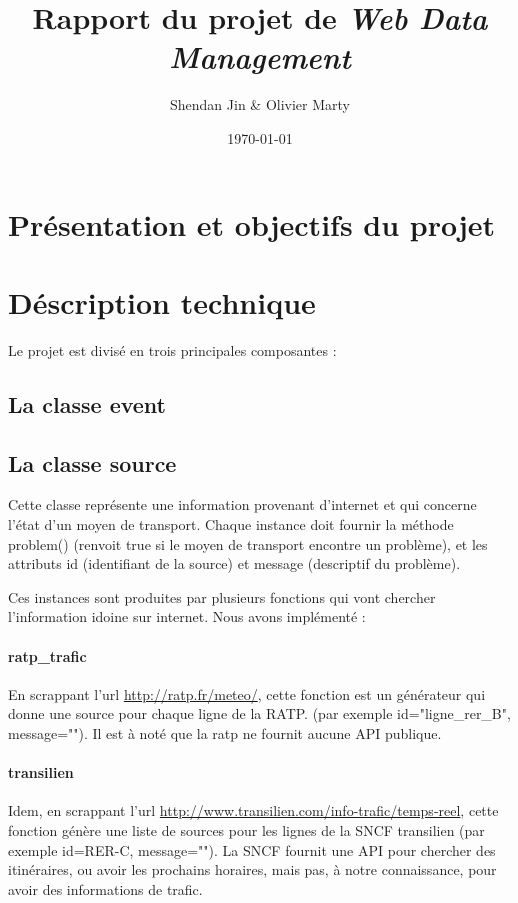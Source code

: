 \documentclass[a4paper, 12pt]{article}
\title{Rapport du projet de \emph{Web Data Management}}
\author{Shendan Jin \& Olivier Marty}
\date\today
\begin{document}
\maketitle

\section{Présentation et objectifs du projet}

\section{Déscription technique}

Le projet est divisé en trois principales composantes :

\subsection{La classe event}

\subsection{La classe source} Cette classe représente une information provenant
d'internet et qui concerne l'état d'un moyen de transport.
Chaque instance doit fournir la méthode problem() (renvoit true si le moyen de
transport encontre un problème), et les attributs id (identifiant de la source)
et message (descriptif du problème).

Ces instances sont produites par plusieurs fonctions qui vont chercher
l'information idoine sur internet. Nous avons implémenté :

\paragraph{ratp\_trafic} En scrappant l'url \url{http://ratp.fr/meteo/}, cette
fonction est un générateur qui donne une source pour chaque ligne de la RATP.
(par exemple id="ligne\_rer\_B", message=""). %
Il est à noté que la ratp ne fournit aucune API publique.

\paragraph{transilien} Idem, en scrappant l'url \url{http://www.transilien.com/info-trafic/temps-reel},
cette fonction génère une liste de sources pour les lignes de la SNCF transilien
(par exemple id=RER-C, message=""). %
La SNCF fournit une API pour chercher des itinéraires, ou avoir les prochains
horaires, mais pas, à notre connaissance, pour avoir des informations de trafic.
\end{document}
